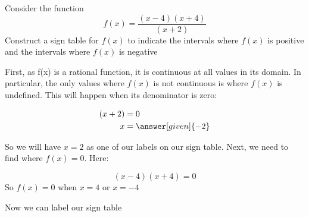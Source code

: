 \documentclass{ximera}
\begin{document}
\begin{example}
Consider the function 
\[
f(x) = \frac{(x-4)(x+4)}{(x+2)}
\]
 Construct a sign table for $f(x)$ to indicate the intervals where $f(x)$ is positive and the intervals where $f(x)$ is negative


\begin{explanation}
First, as f(x) is a rational function, it is continuous at all values in its domain. In particular, the only values where $f(x)$ is not continuous is
where $f(x)$ is undefined. This will happen when its denominator is zero: 

\begin{align*}
  (x+2) &= 0 \\
 x &=\answer[given]{-2}
\end{align*}

So we will have $x=2$ as one of our labels on our sign table. Next, we need to find where $f(x)=0$. Here:

\[
  (x-4)(x+4) = 0 
\]
So $f(x)=0$ when $x=4$ or $x=-4$

Now we can label our sign table

\begin{image}
\end{image}
\end{explanation}
\end{example}
\end{document}
